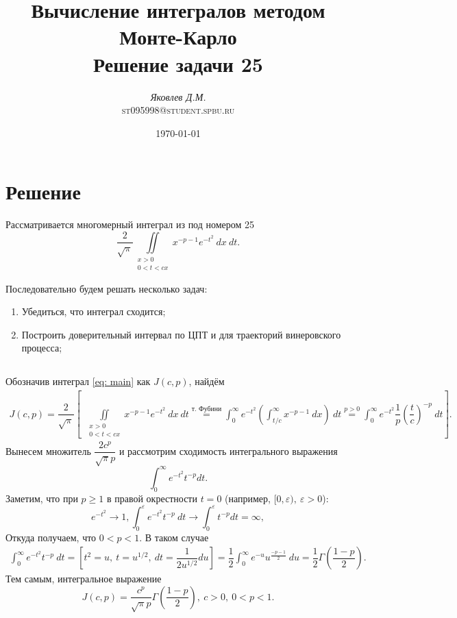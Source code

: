 \documentclass{article}
\title{Вычисление интегралов методом Монте-Карло\\
Решение задачи 25}
\author{\emph{Яковлев Д.М.}\\\textsc{st095998@student.spbu.ru}}
\date{\today}
\begin{document}
	\maketitle
	\section{Решение}

	Рассматривается многомерный интеграл из \cite{ankor} под номером 25
	\begin{equation}\label{eq: main}
		\dfrac{2}{\sqrt{\pi}}\iint\limits_{\substack{x>0\\0<t<cx}}x^{-p-1}e^{-t^2}~dx~dt.
	\end{equation}

	Последовательно будем решать несколько задач:
	\begin{enumerate}
		\item Убедиться, что интеграл сходится;
		\item Построить доверительный интервал по ЦПТ и для траекторий винеровского процесса;
	\end{enumerate}
	\subsection{}
	
		Обозначив интеграл \eqref{eq: main} как $J(c, p)$, найдём
		\begin{align*}
			J(c, p)=\dfrac{2}{\sqrt{\pi}}\left[~~\iint\limits_{\substack{x>0\\0<t<cx}}x^{-p-1}e^{-t^2}~dx~dt\overset{\text{т. Фубини}}{=}\int_{0}^\infty e^{-t^2}\left(\int_{t/c}^\infty x^{-p-1}~dx\right)~dt\overset{p > 0}{=}\int_0^\infty e^{-t^2}\dfrac{1}{p}\left(\dfrac{t}{c}\right)^{-p}~dt\right].
		\end{align*}
		Вынесем множитель $\dfrac{2c^p}{\sqrt{\pi}p}$ и рассмотрим сходимость интегрального выражения
		\begin{equation*}
			\int_0^\infty e^{-t^2}t^{-p}dt.
		\end{equation*}
		Заметим, что при $p\geqslant 1$ в правой окрестности $t=0$ (например, $[0,\varepsilon),~\varepsilon>0$):
		\begin{equation*}
			e^{-t^2}\rightarrow1,\int_0^\varepsilon e^{-t^2}t^{-p}~dt\rightarrow\int_0^\varepsilon t^{-p}dt = \infty,
		\end{equation*}
		Откуда получаем, что $0<p<1$. В таком случае
		\begin{align*}
			\int_0^\infty e^{-t^2}t^{-p}~dt=\left[t^2 = u,~t=u^{1/2},~dt=\dfrac{1}{2u^{1/2}}du\right]=\dfrac{1}{2}\int_0^\infty e^{-u}u^{\frac{-p-1}{2}}~du=\dfrac{1}{2}\Gamma\left(\dfrac{1-p}{2}\right).
		\end{align*}
		Тем самым, интегральное выражение
		\begin{equation*}
			J(c, p)=\dfrac{c^p}{\sqrt{\pi}p}\Gamma\left(\dfrac{1-p}{2}\right),~c>0,~0<p<1.
		\end{equation*}
\end{document}
